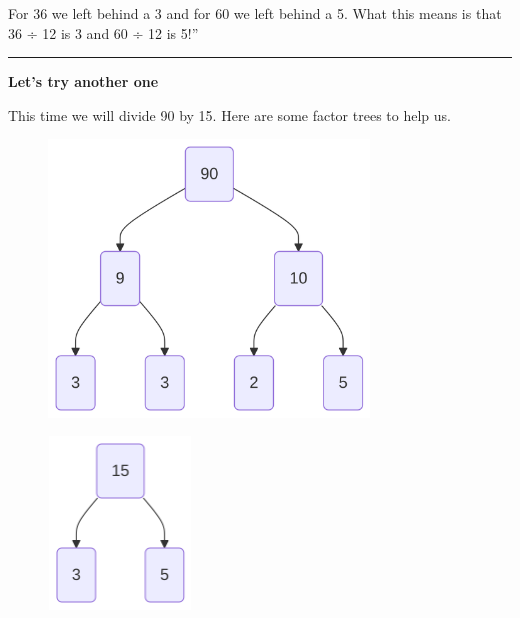 \documentclass[
  letterpaper,
  DIV=11,
  numbers=noendperiod]{scrreprt}
\begin{document}
For 36 we left behind a 3 and for 60 we left behind a 5. What this means
is that 36 ÷ 12 is 3 and 60 ÷ 12 is 5!''

\begin{center}\rule{0.5\linewidth}{0.5pt}\end{center}

\textbf{Let's try another one}

This time we will divide 90 by 15. Here are some factor trees to help
us.

\begin{figure}

\begin{minipage}{0.50\linewidth}

\label{mermaid-diagram}
\includegraphics[width=3.35in,height=2.9in]{chapters/Unit_1/1.3_GCF_&_Simplifying_Fractions_files/figure-latex/mermaid-figure-14.png}

\end{minipage}%
%
\begin{minipage}{0.50\linewidth}

\label{mermaid-diagram}
\includegraphics[width=1.5in,height=1.81in]{chapters/Unit_1/1.3_GCF_&_Simplifying_Fractions_files/figure-latex/mermaid-figure-13.png}

\end{minipage}%

\end{figure}%
\end{document}
